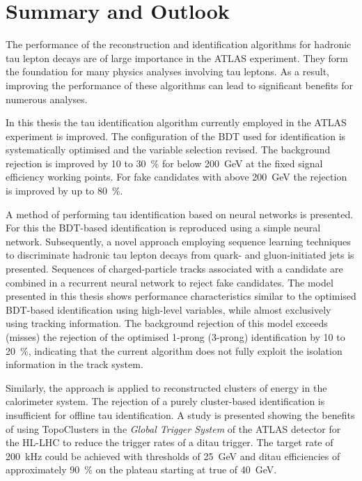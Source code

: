 \chapter{Summary and Outlook}
\label{sec:conclusion}

The performance of the reconstruction and identification algorithms for hadronic
tau lepton decays are of large importance in the ATLAS experiment. They form the
foundation for many physics analyses involving tau leptons. As a result,
improving the performance of these algorithms can lead to significant benefits
for numerous analyses.

In this thesis the tau identification algorithm currently employed in the ATLAS
experiment is improved. The configuration of the BDT used for identification is
systematically optimised and the variable selection revised. The background
rejection is improved by \num{10} to \SI{30}{\percent} for \tauhadvis \pt below
\SI{200}{\GeV} at the fixed signal efficiency working points. For fake
\tauhadvis candidates with \pt above \SI{200}{\GeV} the rejection is improved by
up to \SI{80}{\percent}.

A method of performing tau identification based on neural networks is presented.
For this the BDT-based identification is reproduced using a simple neural
network. Subsequently, a novel approach employing sequence learning techniques
to discriminate hadronic tau lepton decays from quark- and gluon-initiated jets
is presented. Sequences of charged-particle tracks associated with a \tauhadvis
candidate are combined in a recurrent neural network to reject fake \tauhadvis
candidates. The model presented in this thesis shows performance characteristics
similar to the optimised BDT-based identification using high-level variables,
while almost exclusively using tracking information. The background rejection of
this model exceeds (misses) the rejection of the optimised 1-prong (3-prong)
identification by \num{10} to \SI{20}{\percent}, indicating that the current
algorithm does not fully exploit the isolation information in the track system.

Similarly, the approach is applied to reconstructed clusters of energy in the
calorimeter system. The rejection of a purely cluster-based identification is
insufficient for offline tau identification. A study is presented showing the
benefits of using TopoClusters in the \emph{Global Trigger System} of the ATLAS
detector for the HL-LHC to reduce the trigger rates of a ditau trigger. The
target rate of \SI{200}{\kilo\hertz} could be achieved with \tauhadvis \pt
thresholds of \SI{25}{\GeV} and ditau efficiencies of approximately
\SI{90}{\percent} on the plateau starting at true \tauhadvis \pt of
\SI{40}{\GeV}.

